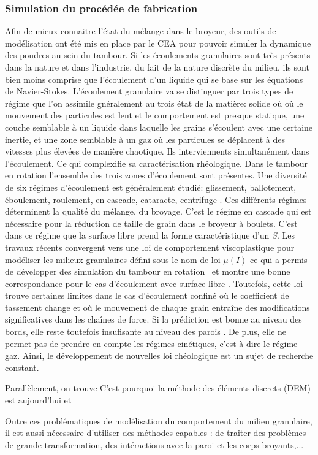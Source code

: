 \subsubsection*{Simulation du procédée de fabrication}

Afin de mieux connaitre l'état du mélange dans le broyeur, des outils de modélisation ont été mis en place par le CEA pour pouvoir simuler la dynamique des poudres au sein du tambour. Si les écoulements granulaires sont très présents dans la nature et dans l'industrie, du fait de la nature discrète du milieu, ils sont bien moins comprise que l'écoulement d'un liquide qui se base sur les équations de Navier-Stokes.
L'écoulement granulaire va se distinguer par trois types de régime que l'on assimile gnéralement au trois état de la matière: solide où où le mouvement des particules est lent et le comportement est presque statique, une couche semblable à un liquide dans laquelle les grains s'écoulent avec une certaine inertie, et une zone semblable à un gaz où les particules se déplacent à des vitesses plus élevées de manière chaotique. Ils interviennents simultanément dans l'écoulement. Ce qui complexifie sa caractérisation rhéologique.
Dans le tambour en rotation l'ensemble des trois zones d'écoulement sont présentes. Une diversité de six régimes d'écoulement est généralement étudié: glissement, ballotement, éboulement, roulement, en cascade, cataracte,  centrifuge \cite{MELLMANN2001251}.
Ces différents régimes déterminent la qualité du mélange, du broyage.
C'est le régime en cascade qui est nécessaire pour la réduction de taille de grain dans le broyeur à boulets. C'est dans ce régime que la surface libre prend la forme caractéristique d'un \textit{S}.
Les travaux récents convergent vers une loi de comportement viscoplastique pour modéliser les milieux granulaires défini sous le nom de loi $\mu(I)$ \cite{gdr_midi_dense_2004,jop_constitutive_2006} ce qui a permis de développer des simulation du tambour en rotation~\cite{Cortet_2009} et montre une bonne correspondance pour le cas d'écoulement avec surface libre \cite{chou_cross-sectional_2009}.
Toutefois, cette loi trouve certaines limites dans le cas d'écoulement confiné où le coefficient de tassement change et où le mouvement de chaque grain entraîne des modifications significatives dans les chaînes de force. Si la prédiction est bonne au niveau des bords, elle reste toutefois insufisante au niveau des parois \cite{Rognon_Miller_Metzger_Einav_2015}. De plus, elle ne permet pas de prendre en compte les régimes cinétiques, c'est à dire le régime gaz. Ainsi, le développement de nouvelles loi rhéologique est un sujet de recherche constant.

Parallèlement, on trouve C'est pourquoi la méthode des éléments discrets (DEM) est aujourd'hui et

Outre ces problématiques de modélisation du comportement du milieu granulaire, il est aussi nécessaire d'utiliser des méthodes capables : de traiter des problèmes de grande transformation, des intéractions avec la paroi et les corps broyants,...



